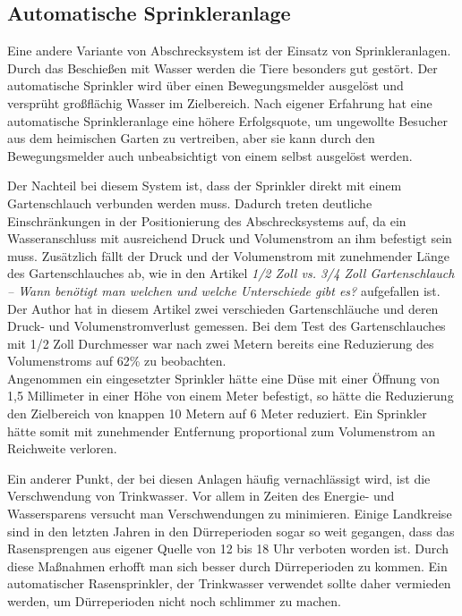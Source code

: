 \subsection{Automatische Sprinkleranlage}

Eine andere Variante von Abschrecksystem ist der Einsatz von Sprinkleranlagen. Durch das Beschießen mit Wasser werden die Tiere besonders gut gestört. Der automatische Sprinkler wird über einen Bewegungsmelder ausgelöst und versprüht großflächig Wasser im Zielbereich. Nach eigener Erfahrung hat eine automatische Sprinkleranlage eine höhere Erfolgsquote, um ungewollte Besucher aus dem heimischen Garten zu vertreiben, aber sie kann durch den Bewegungsmelder auch unbeabsichtigt von einem selbst ausgelöst werden.\cite{anti_wasch}

Der Nachteil bei diesem System ist, dass der Sprinkler direkt mit einem Gartenschlauch verbunden werden muss. Dadurch treten deutliche Einschränkungen in der Positionierung des Abschrecksystems auf, da ein Wasseranschluss mit ausreichend Druck und Volumenstrom an ihm befestigt sein muss. Zusätzlich fällt der Druck und der Volumenstrom mit zunehmender Länge des Gartenschlauches ab, wie in den Artikel \textit{1/2 Zoll vs. 3/4 Zoll Gartenschlauch – Wann benötigt man welchen und welche Unterschiede gibt es?} aufgefallen ist. Der Author hat in diesem Artikel zwei verschieden Gartenschläuche und deren Druck- und Volumenstromverlust gemessen. Bei dem Test des Gartenschlauches mit 1/2 Zoll Durchmesser war nach zwei Metern bereits eine Reduzierung des Volumenstroms auf 62\% zu beobachten.\\

Angenommen ein eingesetzter Sprinkler hätte eine Düse mit einer Öffnung von 1,5 Millimeter in einer Höhe von einem Meter befestigt, so hätte die Reduzierung den Zielbereich von knappen 10 Metern auf 6 Meter reduziert.
Ein Sprinkler hätte somit mit zunehmender Entfernung proportional zum Volumenstrom an Reichweite verloren.

Ein anderer Punkt, der bei diesen Anlagen häufig vernachlässigt wird, ist die Verschwendung von Trinkwasser. Vor allem in Zeiten des Energie- und Wassersparens versucht man Verschwendungen zu minimieren. Einige Landkreise sind in den letzten Jahren in den Dürreperioden sogar so weit gegangen, dass das Rasensprengen aus eigener Quelle von 12 bis 18 Uhr verboten worden ist. Durch diese Maßnahmen erhofft man sich besser durch Dürreperioden zu kommen. Ein automatischer Rasensprinkler, der Trinkwasser verwendet sollte daher vermieden werden, um Dürreperioden nicht noch schlimmer zu machen.\cite{wasser_verbot}

